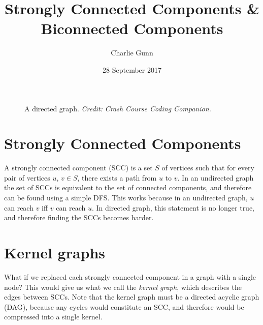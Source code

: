 \documentclass{article}
\title{Strongly Connected Components \& Biconnected Components}
\author{Charlie Gunn}
\date{28 September 2017}
\begin{document}
\maketitle

\begin{figure}[h]
\center
{}
\caption{A directed graph. \textit{Credit: Crash Course Coding Companion.}}
\end{figure}

\section{Strongly Connected Components}

A strongly connected component (SCC) is a set $S$ of vertices such that for every pair of vertices $u$, $v \in S$, there exists a path from $u$ to $v$. In an undirected graph the set of SCCs is equivalent to the set of connected components, and therefore can be found using a simple DFS. This works because in an undirected graph, $u$ can reach $v$ iff $v$ can reach $u$. In directed graph, this statement is no longer true, and therefore finding the SCCs becomes harder.

\section{Kernel graphs}

What if we replaced each strongly connected component in a graph with a single node? This would give us what we call the \textit{kernel graph}, which describes the edges between SCCs. Note that the kernel graph must be a directed acyclic graph (DAG), because any cycles would constitute an SCC, and therefore would be compressed into a single kernel.
\end{document}
